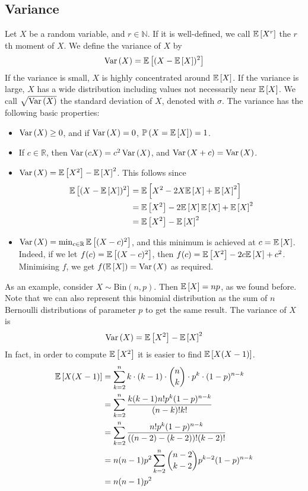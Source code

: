 \subsection{Variance}
Let \(X\) be a random variable, and \(r \in \mathbb N\).
If it is well-defined, we call \(\mathbb{E}\left[{X^r}\right]\) the \(r\)th moment of \(X\).
We define the variance of \(X\) by
\[
	\operatorname{Var}\left({X}\right) = \mathbb{E}\left[{(X - \mathbb{E}\left[{X}\right])^2}\right]
\]
If the variance is small, \(X\) is highly concentrated around \(\mathbb{E}\left[{X}\right]\).
If the variance is large, \(X\) has a wide distribution including values not necessarily near \(\mathbb{E}\left[{X}\right]\).
We call \(\sqrt{\operatorname{Var}\left({X}\right)}\) the standard deviation of \(X\), denoted with \(\sigma\).
The variance has the following basic properties:
\begin{itemize}
	\item \(\operatorname{Var}\left({X}\right) \geq 0\), and if \(\operatorname{Var}\left({X}\right) = 0\), \(\mathbb{P}\left({X = \mathbb{E}\left[{X}\right]}\right) = 1\).
	\item If \(c \in \mathbb R\), then \(\operatorname{Var}\left({cX}\right) = c^2\operatorname{Var}\left({X}\right)\), and \(\operatorname{Var}\left({X + c}\right) = \operatorname{Var}\left({X}\right)\).
	\item \(\operatorname{Var}\left({X}\right) = \mathbb{E}\left[{X^2}\right] - \mathbb{E}\left[{X}\right]^2\).
	      This follows since
		  \begin{align*}
			\mathbb{E}\left[{(X - \mathbb{E}\left[{X}\right])^2}\right] &= \mathbb{E}\left[{X^2 - 2X\mathbb{E}\left[{X}\right] + \mathbb{E}\left[{X}\right]^2}\right] \\
			&= \mathbb{E}\left[{X^2}\right] - 2\mathbb{E}\left[{X}\right] \mathbb{E}\left[{X}\right] + \mathbb{E}\left[{X}\right]^2 \\
			&= \mathbb{E}\left[{X^2}\right] - \mathbb{E}\left[{X}\right]^2
		  \end{align*}
	\item \(\operatorname{Var}\left({X}\right) = \min_{c \in \mathbb R} \mathbb{E}\left[{(X - c)^2}\right]\), and this minimum is achieved at \(c = \mathbb{E}\left[{X}\right]\).
	      Indeed, if we let \(f(c) = \mathbb{E}\left[{(X - c)^2}\right]\), then \(f(c) = \mathbb{E}\left[{X^2}\right] - 2c\mathbb{E}\left[{X}\right] + c^2\).
	      Minimising \(f\), we get \(f(\mathbb{E}\left[{X}\right]) = \operatorname{Var}\left({X}\right)\) as required.
\end{itemize}
As an example, consider \(X \sim \mathrm{Bin}(n, p)\).
Then \(\mathbb{E}\left[{X}\right] = np\), as we found before.
Note that we can also represent this binomial distribution as the sum of \(n\) Bernoulli distributions of parameter \(p\) to get the same result.
The variance of \(X\) is
\[
	\operatorname{Var}\left({X}\right) = \mathbb{E}\left[{X^2}\right] - \mathbb{E}\left[{X}\right]^2
\]
In fact, in order to compute \(\mathbb{E}\left[{X^2}\right]\) it is easier to find \(\mathbb{E}\left[{X(X-1)}\right]\).
\begin{align*}
	\mathbb{E}\left[{X(X-1)}\right] & = \sum_{k=2}^n k \cdot (k-1) \cdot \binom{n}{k} \cdot p^k \cdot (1-p)^{n-k} \\
	                & = \sum_{k=2}^n \frac{k(k-1)n!
	p^k (1-p)^{n-k}}{(n-k)!k!}                                                                    \\
	                & = \sum_{k=2}^n \frac{n!
	p^k (1-p)^{n-k}}{((n-2)-(k-2))!(k-2)!}                                                        \\
	                & = n(n-1)p^2 \sum_{k=2}^n \binom{n-2}{k-2} p^{k-2} (1-p)^{n-k}               \\
	                & = n(n-1)p^2
\end{align*}
